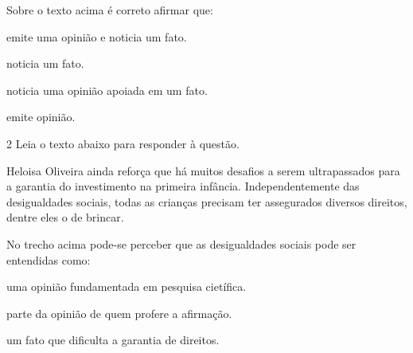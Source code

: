 {\begin{myquote}
\end{myquote}


Sobre o texto acima é correto afirmar que:

\begin{escolha}

  \item emite uma opinião e noticia um fato.

  \item noticia um fato. 

  \item noticia uma opinião apoiada em um fato.

  \item emite opinião. 

\end{escolha}

\num{2} Leia o texto abaixo para responder à questão. 

\begin{myquote}

Heloisa Oliveira ainda reforça que há muitos desafios a serem ultrapassados para a garantia do investimento na primeira infância. Independentemente das desigualdades sociais, todas as crianças precisam ter assegurados diversos direitos, dentre eles o de brincar.

\end{myquote}


No trecho acima pode-se perceber que as desigualdades sociais pode ser
entendidas como:

\begin{escolha}

  \item uma opinião fundamentada em pesquisa cietífica.
  
  \item parte da opinião de quem profere a afirmação.
  
  \item um fato que dificulta a garantia de direitos.
  

\end{escolha}}
